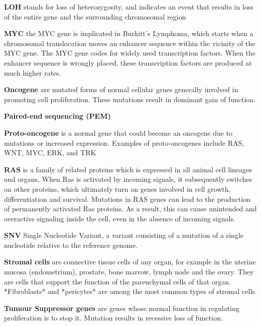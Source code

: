 \textbf{LOH} stands for loss of heterozygosity, and indicates an event that results in loss of the entire gene and the surrounding chromosomal region

\textbf{MYC} the MYC gene is implicated in Burkitt's Lymphoma, which starts when a chromosomal translocation moves an enhancer sequence within the vicinity of the MYC gene. The MYC gene codes for widely used transcription factors. When the enhancer sequence is wrongly placed, these transcription factors are produced at much higher rates.

\textbf{Oncogene} are mutated forms of normal cellular genes generally involved in promoting cell proliferation.  These mutations result in dominant gain of function.

\textbf{Paired-end sequencing (PEM)}

\textbf{Proto-oncogene} is a normal gene that could become an oncogene due to mutations or increased expression. Examples of proto-oncogenes include RAS, WNT, MYC, ERK, and TRK

\textbf{RAS} is a family of related proteins which is expressed in all animal cell lineages and organs, When Ras is activated by incoming signals, it subsequently switches on other proteins, which ultimately turn on genes involved in cell growth, differentiation and survival. Mutations in RAS genes can lead to the production of permanently activated Ras proteins. As a result, this can cause unintended and overactive signaling inside the cell, even in the absence of incoming signals.

\textbf{SNV} Single Nucleotide Variant, a variant consisting of a mutation of a single nucleotide relative to the reference genome.

\textbf{Stromal cells} are connective tissue cells of any organ, for example in the uterine mucosa (endometrium), prostate, bone marrow, lymph node and the ovary. They are cells that support the function of the parenchymal cells of that organ. *Fibroblasts* and *pericytes* are among the most common types of stromal cells.

\textbf{Tumour Suppressor genes} are genes whose normal function in regulating proliferation is to stop it. Mutation results in recessive loss of function.

